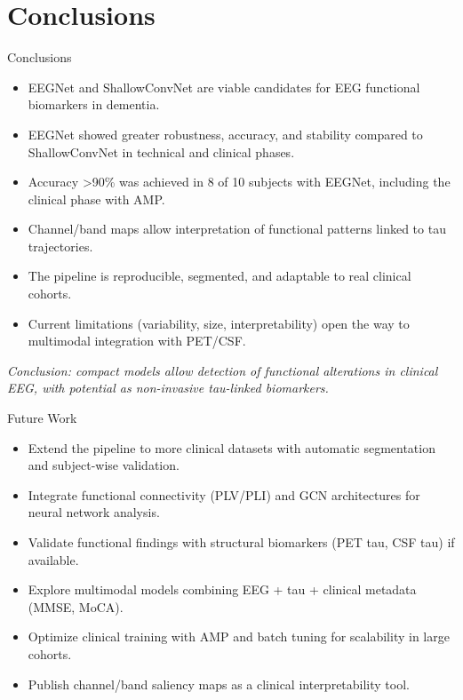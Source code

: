 \documentclass{beamer}
\begin{document}
\section{Conclusions}
\begin{frame}{Conclusions}
\small
\vspace{-0.2cm}
\begin{itemize}
  \item EEGNet and ShallowConvNet are viable candidates for EEG functional biomarkers in dementia.
  \item EEGNet showed greater robustness, accuracy, and stability compared to ShallowConvNet in technical and clinical phases.
  \item Accuracy >90\% was achieved in 8 of 10 subjects with EEGNet, including the clinical phase with AMP.
  \item Channel/band maps allow interpretation of functional patterns linked to tau trajectories.
  \item The pipeline is reproducible, segmented, and adaptable to real clinical cohorts.
  \item Current limitations (variability, size, interpretability) open the way to multimodal integration with PET/CSF.
\end{itemize}
\vspace{0.3cm}
\scriptsize
\textit{Conclusion: compact models allow detection of functional alterations in clinical EEG, with potential as non-invasive tau-linked biomarkers.}
\end{frame}


\begin{frame}{Future Work}
  \begin{itemize}
  \item Extend the pipeline to more clinical datasets with automatic segmentation and subject-wise validation.
  \item Integrate functional connectivity (PLV/PLI) and GCN architectures for neural network analysis.
  \item Validate functional findings with structural biomarkers (PET tau, CSF tau) if available.
  \item Explore multimodal models combining EEG + tau + clinical metadata (MMSE, MoCA).
  \item Optimize clinical training with AMP and batch tuning for scalability in large cohorts.
  \item Publish channel/band saliency maps as a clinical interpretability tool.
\end{itemize}
\end{frame}
\end{document}
